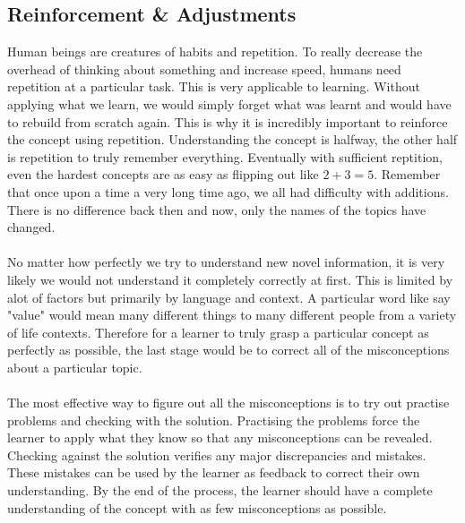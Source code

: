 \documentclass[a4paper, 12pt]{report}
\begin{document}
\begin{center}
\subsection{Reinforcement \& Adjustments}
\begin{comment}
\end{comment}
Human beings are creatures of habits and repetition. 
To really decrease the overhead of thinking about something and increase speed, humans need repetition at a particular task.
This is very applicable to learning. Without applying what we learn, we would simply forget what was learnt and would have to rebuild from scratch again.
This is why it is incredibly important to reinforce the concept using repetition.
Understanding the concept is halfway, the other half is repetition to truly remember everything. 
Eventually with sufficient reptition, even the hardest concepts are as easy as flipping out like $2+3 = 5$. Remember that once upon a time a very long time ago, we all had difficulty with additions.
There is no difference back then and now, only the names of the topics have changed.
\\~\\No matter how perfectly we try to understand new novel information, it is very likely we would not understand it completely correctly at first. 
This is limited by alot of factors but primarily by language and context. A particular word like say "value" would mean many different things to many different people from a variety of life contexts.
Therefore for a learner to truly grasp a particular concept as perfectly as possible, the last stage would be to correct all of the misconceptions about a particular topic.
\\~\\The most effective way to figure out all the misconceptions is to try out practise problems and checking with the solution. 
Practising the problems force the learner to apply what they know so that any misconceptions can be revealed.
Checking against the solution verifies any major discrepancies and mistakes. These mistakes can be used by the learner as feedback to correct their own understanding.
By the end of the process, the learner should have a complete understanding of the concept with as few misconceptions as possible.


\end{center}
\end{document}

